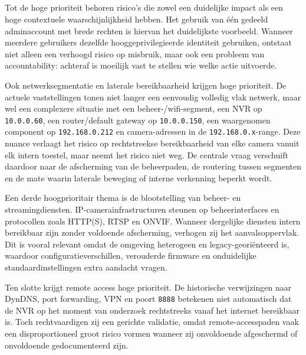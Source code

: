 \subsection{}%
\label{subsec:risico-hoog}

Tot de hoge prioriteit behoren risico's die zowel een duidelijke impact als een hoge contextuele waarschijnlijkheid hebben. Het gebruik van één gedeeld adminaccount met brede rechten is hiervan het duidelijkste voorbeeld. Wanneer meerdere gebruikers dezelfde hooggeprivilegieerde identiteit gebruiken, ontstaat niet alleen een verhoogd risico op misbruik, maar ook een probleem van accountability: achteraf is moeilijk vast te stellen wie welke actie uitvoerde.

Ook netwerksegmentatie en laterale bereikbaarheid krijgen hoge prioriteit. De actuele vaststellingen tonen niet langer een eenvoudig volledig vlak netwerk, maar wel een complexere situatie met een beheer-/wifi-segment, een NVR op \texttt{10.0.0.60}, een router/default gateway op \texttt{10.0.0.150}, een waargenomen component op \texttt{192.168.0.212} en camera-adressen in de \texttt{192.168.0.x}-range. Deze nuance verlaagt het risico op rechtstreekse bereikbaarheid van elke camera vanuit elk intern toestel, maar neemt het risico niet weg. De centrale vraag verschuift daardoor naar de afscherming van de beheerpaden, de routering tussen segmenten en de mate waarin laterale beweging of interne verkenning beperkt wordt.

Een derde hoogprioritair thema is de blootstelling van beheer- en streamingdiensten. IP-camerainfrastructuren steunen op beheerinterfaces en protocollen zoals HTTP(S), RTSP en ONVIF. Wanneer dergelijke diensten intern bereikbaar zijn zonder voldoende afscherming, verhogen zij het aanvalsoppervlak. Dit is vooral relevant omdat de omgeving heterogeen en legacy-georiënteerd is, waardoor configuratieverschillen, verouderde firmware en onduidelijke standaardinstellingen extra aandacht vragen.

Ten slotte krijgt remote access hoge prioriteit. De historische verwijzingen naar DynDNS, port forwarding, VPN en poort \texttt{8888} betekenen niet automatisch dat de NVR op het moment van onderzoek rechtstreeks vanaf het internet bereikbaar is. Toch rechtvaardigen zij een gerichte validatie, omdat remote-accesspaden vaak een disproportioneel groot risico vormen wanneer zij onvoldoende afgeschermd of onvoldoende gedocumenteerd zijn.



